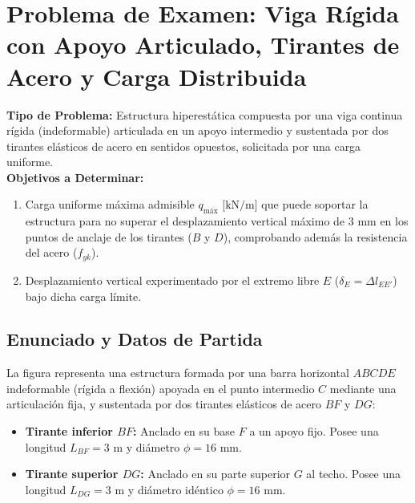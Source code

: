 \section{Problema de Examen: Viga Rígida con Apoyo Articulado, Tirantes de Acero y Carga Distribuida}

\begin{tcolorbox}[colback=white, colframe=myb!80!black, arc=4pt, boxrule=0.9pt, left=8pt, right=8pt, top=7pt, bottom=7pt]
    \textbf{Tipo de Problema:} Estructura hiperestática compuesta por una viga continua rígida (indeformable) articulada en un apoyo intermedio y sustentada por dos tirantes elásticos de acero en sentidos opuestos, solicitada por una carga uniforme.\\
    \textbf{Objetivos a Determinar:}
    \begin{enumerate}
        \item Carga uniforme máxima admisible $q_{\text{máx}}\text{ [kN/m]}$ que puede soportar la estructura para no superar el desplazamiento vertical máximo de $3\text{ mm}$ en los puntos de anclaje de los tirantes ($B$ y $D$), comprobando además la resistencia del acero ($f_{yk}$).
        \item Desplazamiento vertical experimentado por el extremo libre $E$ ($\delta_E = \Delta l_{EE'}$) bajo dicha carga límite.
    \end{enumerate}
\end{tcolorbox}

\subsection{Enunciado y Datos de Partida}

La figura representa una estructura formada por una barra horizontal $ABCDE$ indeformable (rígida a flexión) apoyada en el punto intermedio $C$ mediante una articulación fija, y sustentada por dos tirantes elásticos de acero $BF$ y $DG$:
\begin{itemize}
    \item \textbf{Tirante inferior $BF$:} Anclado en su base $F$ a un apoyo fijo. Posee una longitud $L_{BF} = 3\text{ m}$ y diámetro $\phi = 16\text{ mm}$.
    \item \textbf{Tirante superior $DG$:} Anclado en su parte superior $G$ al techo. Posee una longitud $L_{DG} = 3\text{ m}$ y diámetro idéntico $\phi = 16\text{ mm}$.
\end{itemize}

